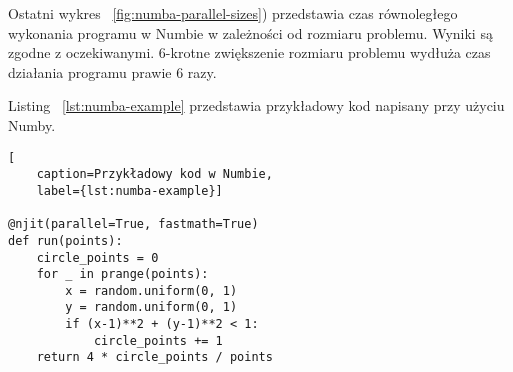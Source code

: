 Ostatni wykres ~\ref{fig:numba-parallel-sizes}) przedstawia czas równoległego wykonania
programu w Numbie w zależności od rozmiaru problemu.
Wyniki są zgodne z oczekiwanymi.
6-krotne zwiększenie rozmiaru problemu wydłuża czas działania programu prawie 6 razy.

Listing ~\ref{lst:numba-example} przedstawia przykładowy kod napisany
przy użyciu Numby.

\begin{lstlisting}[
    caption=Przykładowy kod w Numbie,
    label={lst:numba-example}]

@njit(parallel=True, fastmath=True)
def run(points):
    circle_points = 0
    for _ in prange(points):
        x = random.uniform(0, 1)
        y = random.uniform(0, 1)
        if (x-1)**2 + (y-1)**2 < 1:
            circle_points += 1
    return 4 * circle_points / points
\end{lstlisting}

